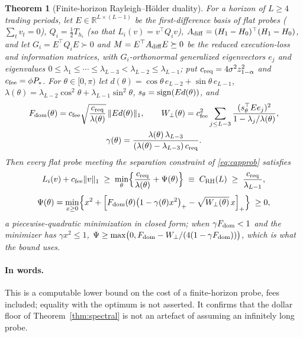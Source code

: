 \documentclass[12pt]{article}
\newtheorem{theorem}{Theorem}[section]
\theoremstyle{definition}
\theoremstyle{remark}
\newcommand{\R}{\mathbb{R}}
\begin{document}
\begin{theorem}[Finite-horizon Rayleigh--H\"older duality]\label{thm:rh}
For a horizon of $L\ge4$ trading periods, let $E\in\R^{L\times(L-1)}$ be the first-difference basis of flat probes ($\sum_tv_t=0$), $Q_i=\tfrac12T_{h_i}$ (so that $L_i(v)=v^\top Q_iv$), $A_{\rm diff}=(H_1-H_0)^\top(H_1-H_0)$, and let $G_i=E^\top Q_iE\succ0$ and $M=E^\top A_{\rm diff}E\succeq0$ be the reduced execution-loss and information matrices, with $G_i$-orthonormal generalized eigenvectors $e_j$ and eigenvalues $0\le\lambda_1\le\cdots\le\lambda_{L-3}<\lambda_{L-2}\le\lambda_{L-1}$; put $c_{\rm req}=4\sigma^2z_{1-\alpha}^2$ and $c_{\rm fee}=\phi P_*$. For $\theta\in[0,\pi)$ let $d(\theta)=\cos\theta\,e_{L-2}+\sin\theta\,e_{L-1}$, $\lambda(\theta)=\lambda_{L-2}\cos^2\theta+\lambda_{L-1}\sin^2\theta$, $s_\theta={\rm sign}(Ed(\theta))$, and
\begin{equation}\label{eq:rhdefs}
\begin{gathered}
F_{\rm dom}(\theta)=c_{\rm fee}\sqrt{\frac{c_{\rm req}}{\lambda(\theta)}}\,\|Ed(\theta)\|_1,\qquad W_\perp(\theta)=c_{\rm fee}^2\sum_{j\le L-3}\frac{(s_\theta^\top Ee_j)^2}{1-\lambda_j/\lambda(\theta)},\\
\gamma(\theta)=\frac{\lambda(\theta)\,\lambda_{L-3}}{(\lambda(\theta)-\lambda_{L-3})\,c_{\rm req}} .
\end{gathered}
\end{equation}
Then every flat probe meeting the separation constraint of \eqref{eq:capprob} satisfies
\begin{equation}\label{eq:rh}
L_i(v)+c_{\rm fee}\|v\|_1\;\ge\;\min_{\theta}\Bigl\{\frac{c_{\rm req}}{\lambda(\theta)}+\Psi(\theta)\Bigr\}\;\equiv\;C_{\rm RH}(L)\;\ge\;\frac{c_{\rm req}}{\lambda_{L-1}},
\end{equation}
\[
\Psi(\theta)=\min_{x\ge0}\Bigl\{x^2+\Bigl[F_{\rm dom}(\theta)\bigl(1-\gamma(\theta)x^2\bigr)_+-\sqrt{W_\perp(\theta)}\,x\Bigr]_+\Bigr\}\;\ge0 ,
\]
a piecewise-quadratic minimization in closed form; when $\gamma F_{\rm dom}<1$ and the minimizer has $\gamma x^2\le1$, $\Psi\ge\max\bigl(0,F_{\rm dom}-W_\perp/(4(1-\gamma F_{\rm dom}))\bigr)$, which is what the bound uses.
\end{theorem}

\paragraph{In words.} This is a computable lower bound on the cost of a finite-horizon probe, fees included; equality with the optimum is not asserted. It confirms that the dollar floor of Theorem~\ref{thm:spectral} is not an artefact of assuming an infinitely long probe.
\end{document}

